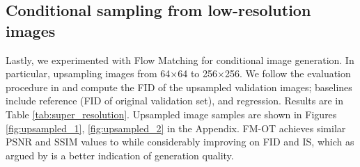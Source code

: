 \documentclass{article}
\renewcommand{\ra}[1]{\renewcommand{\arraystretch}{#1}}
\begin{document}
\subsection{Conditional sampling from low-resolution images}

\begin{table}\vspace{-10pt}
\ra{1.05}
\setlength{\tabcolsep}{2.0pt}
\caption{Image super-resolution on the ImageNet validation set.}\label{tab:super_resolution}
\end{table} 
{Lastly, we experimented with Flow Matching for conditional image generation. In particular, upsampling images from 64$\times$64 to 256$\times$256.
We follow the evaluation procedure in \citep{saharia2022image} and compute the FID of the upsampled validation images; baselines include reference (FID of original validation set), and regression. Results are in Table \ref{tab:super_resolution}. Upsampled image samples are shown in Figures \ref{fig:upsampled_1}, \ref{fig:upsampled_2} in the Appendix. FM-OT achieves similar PSNR and SSIM values to \citep{saharia2022image} while considerably improving on FID and IS, which as argued by \citep{saharia2022image} is a better indication of generation quality.

}


\end{document}
